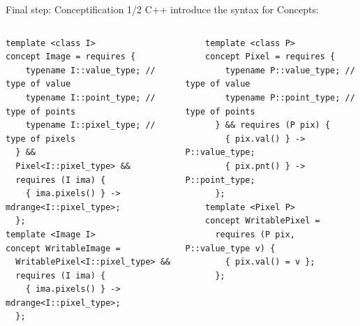 \documentclass[12pt,aspectratio=169]{beamer}
\begin{document}
\begin{frame}[fragile]{Final step: Conceptification 1/2}
  C++ introduce the syntax for Concepts:
  \begin{columns}[T,onlytextwidth]
    \begin{verbatim}
template <class I>
concept Image = requires {
    typename I::value_type; // type of value
    typename I::point_type; // type of points
    typename I::pixel_type; // type of pixels
  } &&
  Pixel<I::pixel_type> &&
  requires (I ima) {
    { ima.pixels() } -> mdrange<I::pixel_type>;
  };
template <Image I>
concept WritableImage = 
  WritablePixel<I::pixel_type> &&
  requires (I ima) {
    { ima.pixels() } -> mdrange<I::pixel_type>;
  };
  \end{verbatim}
    
    \begin{verbatim}
    template <class P>
    concept Pixel = requires {
        typename P::value_type; // type of value
        typename P::point_type; // type of points
      } && requires (P pix) {
        { pix.val() } -> P::value_type;
        { pix.pnt() } -> P::point_type;
      };
    template <Pixel P>
    concept WritablePixel = 
      requires (P pix, P::value_type v) {
        { pix.val() = v };
      };
  \end{verbatim}
  \end{columns}
  \pdfcomment[icon=Note]{   }
  \pdfcomment[icon=Note]{   }
\end{frame}
\end{document}
